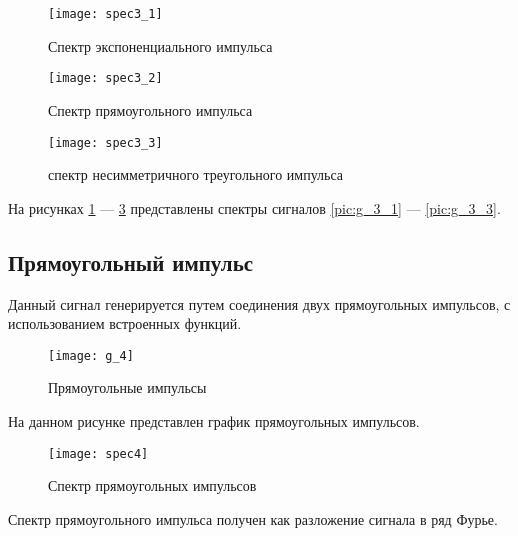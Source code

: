 \begin{figure}[H]
	\begin{center}
		\texttt{[image: spec3\_1]}
		\caption{Спектр экспоненциального импульса} 
		\label{pic:spec3_1} %
	\end{center}
\end{figure}
\begin{figure}[H]
	\begin{center}
		\texttt{[image: spec3\_2]}
		\caption{Спектр прямоугольного импульса} 
		\label{pic:spec3_2} %
	\end{center}
\end{figure}
\begin{figure}[H]
	\begin{center}
		\texttt{[image: spec3\_3]}
		\caption{спектр несимметричного треугольного импульса} 
		\label{pic:spec3_3} %
	\end{center}
\end{figure}
На рисунках  \ref{pic:spec3_1} — \ref{pic:spec3_3} представлены спектры сигналов \ref{pic:g_3_1} — \ref{pic:g_3_3}.

\subsection{Прямоугольный импульс}


\parindent=1cm
Данный сигнал генерируется путем соединения двух прямоугольных импульсов, с использованием встроенных функций.

\begin{figure}[H]
	\begin{center}
		\texttt{[image: g\_4]}
		\caption{Прямоугольные импульсы} 
		\label{pic:g_4} %
	\end{center}
\end{figure}
На данном рисунке представлен график прямоугольных импульсов.

\begin{figure}[H]
	\begin{center}
		\texttt{[image: spec4]}
		\caption{Спектр прямоугольных импульсов} 
		\label{pic:spec4} %
	\end{center}
\end{figure}
Спектр прямоугольного импульса получен как разложение сигнала в ряд Фурье.

